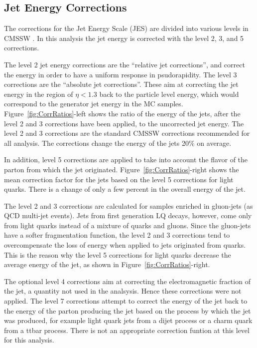 \subsection{Jet Energy Corrections}

The corrections for the Jet Energy Scale (JES) are divided into various levels in CMSSW \cite{JES}.  
In this analysis the jet energy is corrected with the level 2, 3, and 5 corrections.

The level 2 jet energy corrections are the 
``relative jet corrections'', and correct the energy in order to have a uniform response in psudorapidity.  
The level 3 corrections are the ``absolute jet corrections''.  These aim at correcting the jet energy in the 
region of $\eta < 1.3$ back to the particle level energy, which would correspond to the generator jet energy in the MC samples. 
Figure~\ref{fig:CorrRatios}-left shows the ratio of the energy of the jets, after 
the level 2 and 3 corrections have been applied, to the uncorrected jet energy.  
The level 2 and 3 corrections are the standard CMSSW corrections recommended for all analysis. 
The corrections change the energy of the jets 20\% on average.

In addition, level 5 corrections are applied to take into account the flavor of the parton from which the jet originated.
Figure~\ref{fig:CorrRatios}-right shows the mean correction factor for the jets based on the level 5 corrections for light quarks.  
There is a change of only a few percent in the overall energy of the jet.  

The level 2 and 3 corrections are calculated for samples enriched in gluon-jets (as QCD multi-jet events). Jets from 
first generation LQ decays, however, come only from light quarks instead of a mixture of quarks and gluons.  Since the gluon-jets have
a softer fragmentation function, the level 2 and 3 corrections tend to overcompensate the loss of energy when applied to jets originated 
from quarks. This is the reason why the level 5 corrections for light quarks decrease the average energy of the jet, 
as shown in Figure~\ref{fig:CorrRatios}-right. 

The optional level 4 corrections aim at correcting the electromagnetic fraction of the jet, a quantity not used in the analsysis.  
Hence these corrections were not applied.
The level 7 corrections attempt to correct the energy of the jet back to the energy of the parton producing the jet based on the process
by which the jet was produced, for example light quark jets from a dijet process or a charm quark from a ttbar process.  There is not an appropriate 
correction funtion at this level for this analysis.

